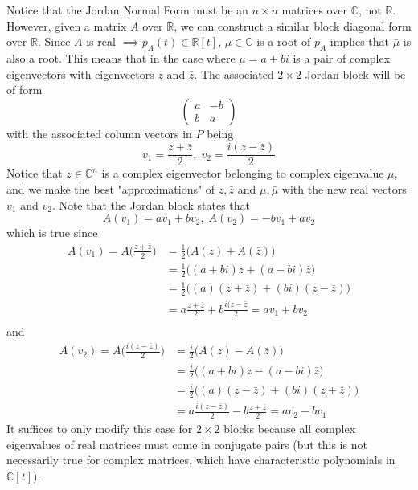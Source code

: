 \documentclass{article}
\theoremstyle{remark}
\theoremstyle{definition}
\begin{document}
    Notice that the Jordan Normal Form must be an $n \times n$ matrices over $\mathbb{C}$, not $\mathbb{R}$. However, given a matrix $A$ over $\mathbb{R}$, we can construct a similar block diagonal form over $\mathbb{R}$. Since $A$ is real $\implies p_A (t) \in \mathbb{R}[t]$, $\mu \in \mathbb{C}$ is a root of $p_A$ implies that $\bar{\mu}$ is also a root. This means that in the case where $\mu = a \pm b i$ is a pair of complex eigenvectors with eigenvectors $z$ and $\bar{z}$. The associated $2 \times 2$ Jordan block will be of form
    \[\begin{pmatrix}
    a&-b\\ b&a
    \end{pmatrix}\]
    with the associated column vectors in $P$ being
    \[v_1 = \frac{z + \bar{z}}{2}, \; v_2 = \frac{i (z - \bar{z})}{2}\]
    Notice that $z \in \mathbb{C}^n$ is a complex eigenvector belonging to complex eigenvalue $\mu$, and we make the best "approximations" of $z, \bar{z}$ and $\mu, \bar{\mu}$ with the new real vectors $v_1$ and $v_2$. Note that the Jordan block states that
    \[A(v_1) = a v_1 + b v_2, \; A(v_2) = -b v_1 + a v_2\]
    which is true since 
    \begin{align*}
        A(v_1) = A\Big( \frac{z + \bar{z}}{2} \Big) & = \frac{1}{2} \big( A(z) + A(\bar{z}) \big) \\
        & = \frac{1}{2}\big( (a+bi)z + (a-bi) \bar{z} \big) \\
        & = \frac{1}{2} \big( (a)(z + \bar{z}) + (bi) (z - \bar{z})\big) \\
        & = a \frac{z + \bar{z}}{2} + b \frac{i(z-\bar{z}}{2} = a v_1 + b v_2 \\
    \end{align*}
    and 
    \begin{align*}
        A(v_2) = A \Big( \frac{i(z-\bar{z})}{2} \Big) & = \frac{i}{2} \big( A(z) - A(\bar{z}) \big) \\
        & = \frac{i}{2} \big( (a+bi) z - (a-bi) \bar{z}\big) \\
        & = \frac{i}{2} \big( (a) (z - \bar{z}) + (bi)(z+\bar{z})\big) \\
        & = a \frac{i(z-\bar{z})}{2} - b \frac{z + \bar{z}}{2} = a v_2 - b v_1
    \end{align*}
    It suffices to only modify this case for $2 \times 2$ blocks because all complex eigenvalues of real matrices must come in conjugate pairs (but this is not necessarily true for complex matrices, which have characteristic polynomials in $\mathbb{C}[t]$). 
\end{document}

